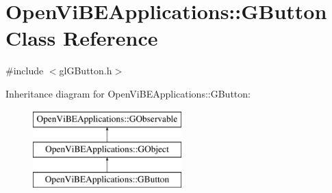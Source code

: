 \hypertarget{classOpenViBEApplications_1_1GButton}{
\section{OpenViBEApplications::GButton Class Reference}
\label{classOpenViBEApplications_1_1GButton}
}


{\ttfamily \#include $<$glGButton.h$>$}

Inheritance diagram for OpenViBEApplications::GButton:\begin{figure}[H]
\begin{center}
\leavevmode
\includegraphics[height=3.000000cm]{classOpenViBEApplications_1_1GButton}
\end{center}
\end{figure}
